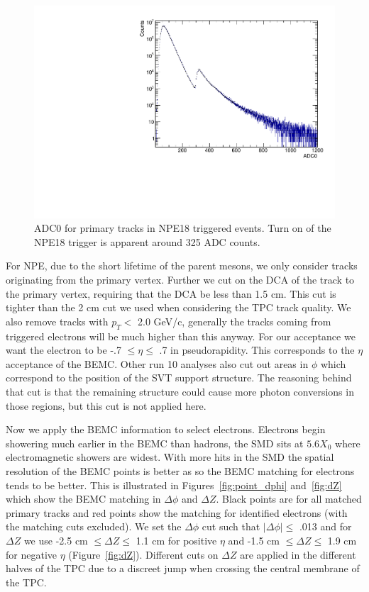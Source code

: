 \begin{figure}[htbp]
\begin{center}
\includegraphics[scale=.75]{Plots/NPE/ADC0_NPE18.pdf}
\end{center}
\caption[ADC0 Distribution for NPE18]{ADC0 for primary tracks in NPE18 triggered events. Turn on of the NPE18 trigger is apparent around 325 ADC counts.}
\label{fig:ADC0}
\end{figure}

For NPE, due to the short lifetime of the parent mesons, we only consider tracks originating from the primary vertex. Further we cut on the DCA of the track to the primary vertex, requiring that the DCA be less than 1.5 cm. This cut is tighter than the 2 cm cut we used when considering the TPC track quality. We also remove tracks with $p_T <$ 2.0 GeV/c, generally the tracks coming from triggered electrons will be much higher than this anyway. For our acceptance we want the electron to be -.7 $\leq \eta \leq$ .7 in  pseudorapidity. This corresponds to the $\eta$ acceptance of the BEMC. Other run 10 analyses also cut out areas in $\phi$ which correspond to the position of the SVT support structure. The reasoning behind that cut is that the remaining structure could cause more photon conversions in those regions, but this cut is not applied here.

Now we apply the BEMC information to select electrons. Electrons begin showering much earlier in the BEMC than hadrons, the SMD sits at $5.6 X_0$ where electromagnetic showers are widest. With more hits in the SMD the spatial resolution of the BEMC points is better as so the BEMC matching for electrons tends to be better. This is illustrated in Figures~\ref{fig:point_dphi} and~\ref{fig:dZ} which show the BEMC matching in $\Delta\phi$ and $\Delta Z$. Black points are for all matched primary tracks and red points show the matching for identified electrons (with the matching cuts excluded). We set the $\Delta\phi$ cut such that $|\Delta\phi| \leq$ .013 and for $\Delta Z$ we use -2.5 cm $\leq \Delta Z \leq$ 1.1 cm for positive $\eta$ and -1.5 cm $\leq \Delta Z \leq$ 1.9 cm for negative $\eta$ (Figure~\ref{fig:dZ}). Different cuts on $\Delta Z$ are applied in the different halves of the TPC due to a discreet jump when crossing the central membrane of the TPC.


